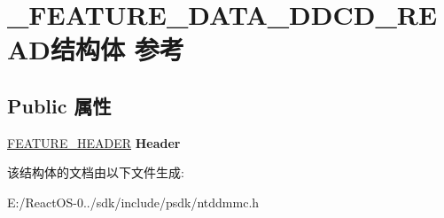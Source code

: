 \hypertarget{struct___f_e_a_t_u_r_e___d_a_t_a___d_d_c_d___r_e_a_d}{}\section{\+\_\+\+F\+E\+A\+T\+U\+R\+E\+\_\+\+D\+A\+T\+A\+\_\+\+D\+D\+C\+D\+\_\+\+R\+E\+A\+D结构体 参考}
\label{struct___f_e_a_t_u_r_e___d_a_t_a___d_d_c_d___r_e_a_d}
\subsection*{Public 属性}
\begin{DoxyCompactItemize}
\item 
\mbox{\label{struct___f_e_a_t_u_r_e___d_a_t_a___d_d_c_d___r_e_a_d_abf167638d54bdcf1e2b4bd131c54ce2c}} 
\hyperlink{struct___f_e_a_t_u_r_e___h_e_a_d_e_r}{F\+E\+A\+T\+U\+R\+E\+\_\+\+H\+E\+A\+D\+ER} {\bfseries Header}
\end{DoxyCompactItemize}


该结构体的文档由以下文件生成\+:\begin{DoxyCompactItemize}
\item 
E\+:/\+React\+O\+S-\/0../sdk/include/psdk/ntddmmc.\+h\end{DoxyCompactItemize}
